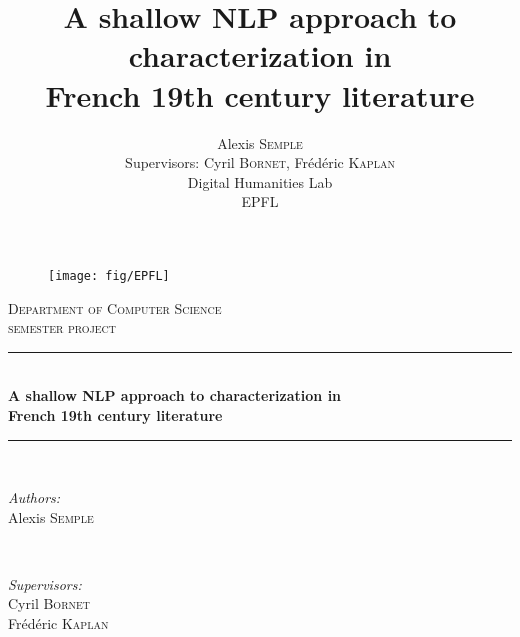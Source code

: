\documentclass[a4paper, 11pt, titlepage]{article}
\title{A shallow NLP approach to characterization in \\French 19th century literature}
\author{Alexis \textsc{Semple} \\ 
Supervisors: Cyril \textsc{Bornet}, Frédéric \textsc{Kaplan} \\ 
Digital Humanities Lab \\
EPFL}
\begin{document}
\begin{titlepage}

\newcommand{\HRule}{\rule{\linewidth}{0.5mm}} %

\center %
 
\begin{figure}[t]
\centering
\texttt{[image: fig/EPFL]}
\end{figure} 
\vspace{3em}

\textsc{\large Department of Computer Science \\ semester project}\\[0.9cm] %


\HRule \\[0.4cm]
{ \Large \bfseries A shallow NLP approach to characterization in \\French 19th century literature}\\ [0.3cm] %
\HRule \\[2.5cm]
 

\begin{minipage}{0.4\textwidth}
\begin{flushleft} \large
\emph{Authors:}\\
Alexis \textsc{Semple}
\end{flushleft}
\end{minipage}
~
\begin{minipage}{0.4\textwidth}
\begin{flushright} \large
\emph{Supervisors:} \\
Cyril \textsc{Bornet}\\ 
Frédéric \textsc{Kaplan}
\end{flushright}
\end{minipage}\\[4cm]


\end{titlepage}
\end{document}
